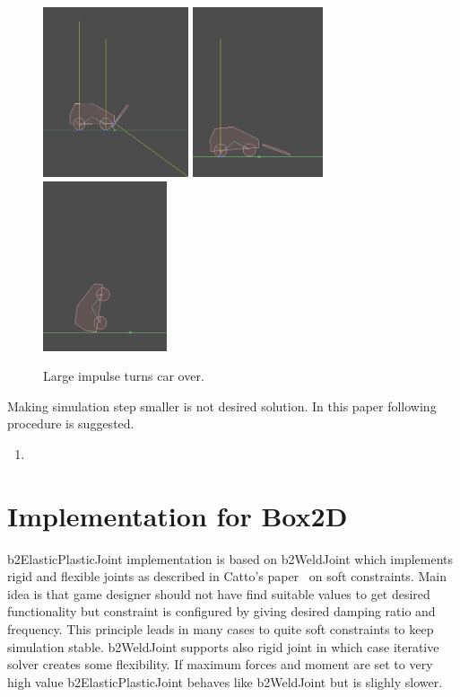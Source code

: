 \documentclass{jcgt}
\begin{document}
\begin{figure}[htb]
  \centering
   \includegraphics[height=5cm]{figs/tippingCar1.png}
   \includegraphics[height=5cm]{figs/tippingCar2.png}
   \includegraphics[height=5cm]{figs/tippingCar3.png}
   \caption{\label{fig:tippingCar}
     Large impulse turns car over.}
\end{figure}
Making simulation step smaller is not desired solution.
In this paper following procedure is suggested.

\begin{enumerate}
\item 
\end{enumerate}

\section{Implementation for Box2D}
b2ElasticPlasticJoint implementation is based on b2WeldJoint which implements rigid and flexible joints as
described in Catto's paper~ on soft constraints. Main idea is that game designer should not have
find suitable values to get desired functionality but constraint is configured by giving desired  damping ratio and frequency.
This principle leads in many cases to quite soft constraints to keep simulation stable. 
b2WeldJoint supports also rigid joint in which case iterative solver creates some flexibility.
If maximum forces and moment are set to very high value b2ElasticPlasticJoint behaves like b2WeldJoint but is slighly slower.
\end{document}
